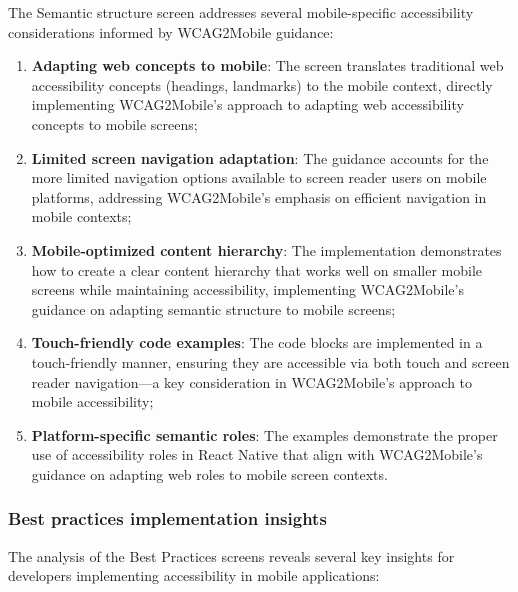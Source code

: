 The Semantic structure screen addresses several mobile-specific accessibility considerations informed by WCAG2Mobile guidance:

\begin{enumerate}
    \item \textbf{Adapting web concepts to mobile}: The screen translates traditional web accessibility concepts (headings, landmarks) to the mobile context, directly implementing WCAG2Mobile's approach to adapting web accessibility concepts to mobile screens;
    
    \item \textbf{Limited screen navigation adaptation}: The guidance accounts for the more limited navigation options available to screen reader users on mobile platforms, addressing WCAG2Mobile's emphasis on efficient navigation in mobile contexts;
    
    \item \textbf{Mobile-optimized content hierarchy}: The implementation demonstrates how to create a clear content hierarchy that works well on smaller mobile screens while maintaining accessibility, implementing WCAG2Mobile's guidance on adapting semantic structure to mobile screens;
    
    \item \textbf{Touch-friendly code examples}: The code blocks are implemented in a touch-friendly manner, ensuring they are accessible via both touch and screen reader navigation—a key consideration in WCAG2Mobile's approach to mobile accessibility;
    
    \item \textbf{Platform-specific semantic roles}: The examples demonstrate the proper use of accessibility roles in React Native that align with WCAG2Mobile's guidance on adapting web roles to mobile screen contexts.
\end{enumerate}

\subsubsection{Best practices implementation insights}
\label{subsubsec:best-practices-insights}

The analysis of the Best Practices screens reveals several key insights for developers implementing accessibility in mobile applications:

